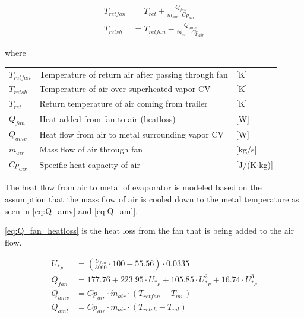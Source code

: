 \begin{align}
	T_{retfan} 		& = T_{ret} + \frac{Q_{fan}}{\dot{m}_{air} \cdot Cp_{air}} 		\label{eq:T_retfan} 		\\
	T_{retsh} 		& = T_{retfan} - \frac{Q_{amv}}{\dot{m}_{air} \cdot Cp_{air}} 	\label{eq:T_retsh}
\end{align}

where

\begin{center}
	\begin{tabular}{l p{10cm} l}
		$T_{retfan}$    & Temperature of return air after passing through fan & [\si{K}]                          \\
		$T_{retsh}$     & Temperature of air over superheated vapor CV        & [\si{K}]                          \\
		$T_{ret}$       & Return temperature of air coming from trailer       & [\si{K}]                          \\
		$Q_{fan}$       & Heat added from fan to air (heatloss)               & [\si{W}]                          \\
		$Q_{amv}$       & Heat flow from air to metal surrounding vapor CV    & [\si{W}]                          \\
		$\dot{m}_{air}$ & Mass flow of air through fan                        & [\si{kg}/\si{s}]                  \\
		$Cp_{air}$      & Specific heat capacity of air                       & [\si{J}/(\si{K}$ \cdot $\si{kg})]
	\end{tabular}
\end{center}

\medskip
The heat flow from air to metal of evaporator is modeled based on the assumption that the mass flow of air is cooled down to the metal temperature as seen in \cref{eq:Q_amv} and \cref{eq:Q_aml}.

\cref{eq:Q_fan_heatloss} is the heat loss from the fan that is being added to the air flow.

\begin{align}
	U_{*_P} & = \left( \frac{U_{fan}}{3060}\cdot 100 - 55.56 \right) \cdot 0.0335 \\
	Q_{fan} & = 177.76 + 223.95 \cdot U_{*_P} + 105.85 \cdot U_{*_P}^2 + 16.74 \cdot U_{*_P}^3
	\label{eq:Q_fan_heatloss}  \\
	Q_{amv} 		& = Cp_{air} \cdot \dot{m}_{air} \cdot (T_{retfan} - T_{mv}) 	\label{eq:Q_amv} \\
	Q_{aml} 		& = Cp_{air} \cdot \dot{m}_{air} \cdot (T_{retsh} - T_{ml}) 	\label{eq:Q_aml}
\end{align}

